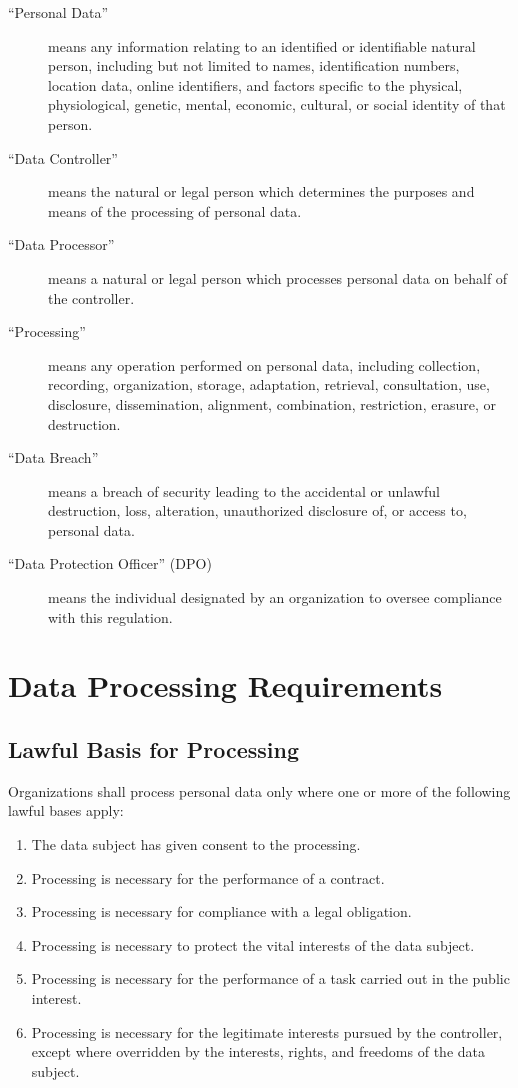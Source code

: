 \documentclass[
    language=english,
    doctype=article,
    institution=none,
]{../../omnilatex}
\begin{document}
\begin{description}
    \item[``Personal Data''] means any information relating to an identified
        or identifiable natural person, including but not limited to names,
        identification numbers, location data, online identifiers, and
        factors specific to the physical, physiological, genetic, mental,
        economic, cultural, or social identity of that person.
    \item[``Data Controller''] means the natural or legal person which
        determines the purposes and means of the processing of personal
        data.
    \item[``Data Processor''] means a natural or legal person which
        processes personal data on behalf of the controller.
    \item[``Processing''] means any operation performed on personal data,
        including collection, recording, organization, storage, adaptation,
        retrieval, consultation, use, disclosure, dissemination, alignment,
        combination, restriction, erasure, or destruction.
    \item[``Data Breach''] means a breach of security leading to the
        accidental or unlawful destruction, loss, alteration, unauthorized
        disclosure of, or access to, personal data.
    \item[``Data Protection Officer'' (DPO)] means the individual
        designated by an organization to oversee compliance with this
        regulation.
\end{description}

\section{Data Processing Requirements}

\subsection{Lawful Basis for Processing}

Organizations shall process personal data only where one or more of the
following lawful bases apply:

\begin{enumerate}
    \item The data subject has given consent to the processing.
    \item Processing is necessary for the performance of a contract.
    \item Processing is necessary for compliance with a legal obligation.
    \item Processing is necessary to protect the vital interests of the
        data subject.
    \item Processing is necessary for the performance of a task carried out
        in the public interest.
    \item Processing is necessary for the legitimate interests pursued by
        the controller, except where overridden by the interests, rights,
        and freedoms of the data subject.
\end{enumerate}
\end{document}

